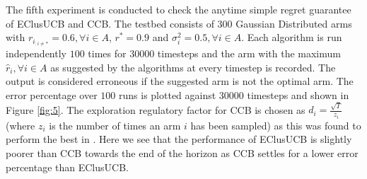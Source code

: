 	
	The fifth experiment is conducted to check the anytime simple regret guarantee of EClusUCB and CCB. The testbed consists of $300$ Gaussian Distributed arms with $r_{i_{:{{i}\neq {*}}}}=0.6,\forall i\in A$, $r^{*}=0.9$ and $\sigma_{i}^{2}=0.5,\forall i\in A$. Each algorithm is run independently $100$ times for $30000$ timesteps and the arm with the maximum $\hat{r}_i,\forall i\in A$ as suggested by the algorithms at every timestep is recorded. The output is considered erroneous if the suggested arm is not the optimal arm. The error percentage over $100$ runs is plotted against $30000$ timesteps and shown in Figure \ref{fig:5}. The exploration regulatory factor for CCB is chosen as $d_i=\frac{\sqrt{T}}{z_{i}}$ (where $z_{i}$ is the number of times an arm ${i}$ has been sampled) as this was found to perform the best in \cite{liu2016modification}. Here we see that the performance of EClusUCB is slightly poorer than CCB towards the end of the horizon as CCB settles for a lower error percentage than EClusUCB.

